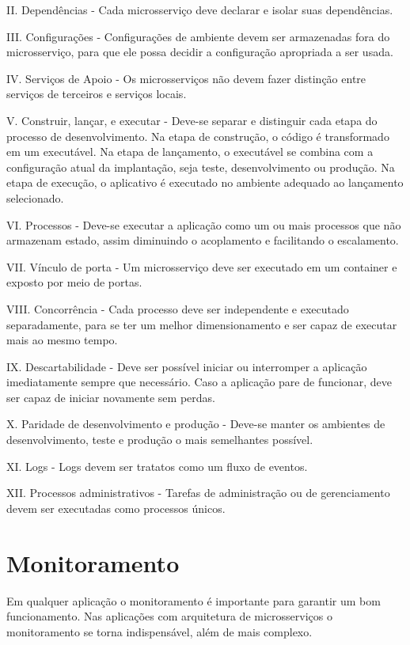 II. Dependências - Cada microsserviço deve declarar e isolar suas dependências.

III. Configurações - Configurações de ambiente devem ser armazenadas fora do microsserviço, para que ele possa decidir a configuração apropriada a ser usada.

IV. Serviços de Apoio - Os microsserviços não devem fazer distinção entre serviços de terceiros e serviços locais.

V. Construir, lançar, e executar - Deve-se separar e distinguir cada etapa do processo de desenvolvimento. Na etapa de construção, o código é transformado em um executável. Na etapa de lançamento, o executável se combina com a configuração atual da implantação, seja teste, desenvolvimento ou produção. Na etapa de execução, o aplicativo é executado no ambiente adequado ao lançamento selecionado.

VI. Processos - Deve-se executar a aplicação como um ou mais processos que não armazenam estado, assim diminuindo o acoplamento e facilitando o escalamento.

VII. Vínculo de porta - Um microsserviço deve ser executado em um container e exposto por meio de portas.

VIII. Concorrência - Cada processo deve ser independente e executado separadamente, para se ter um melhor dimensionamento e ser capaz de executar mais ao mesmo tempo.

IX. Descartabilidade - Deve ser possível iniciar ou interromper a aplicação imediatamente sempre que necessário. Caso a aplicação pare de funcionar, deve ser capaz de iniciar novamente sem perdas.

X. Paridade de desenvolvimento e produção - Deve-se manter os ambientes de desenvolvimento, teste e produção o mais semelhantes possível.

XI. Logs - Logs devem ser tratatos como um fluxo de eventos.

XII. Processos administrativos - Tarefas de administração ou de gerenciamento devem ser executadas como processos únicos. \cite{12factor, oracle_microservices}

\section{Monitoramento}

Em qualquer aplicação o monitoramento é importante para garantir um bom funcionamento. Nas aplicações com arquitetura de microsserviços o monitoramento se torna indispensável, além de mais complexo. %

